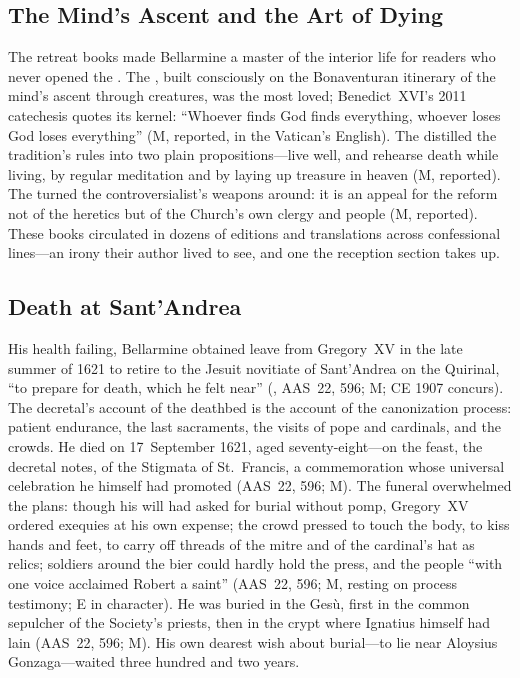\subsection{The Mind's Ascent and the Art of Dying}

The retreat books made Bellarmine a master of the interior life
for readers who never opened the . The
, built consciously on the
Bonaventuran itinerary of the mind's ascent through creatures,
was the most loved; Benedict~XVI's 2011 catechesis quotes its
kernel: ``Whoever finds God finds everything, whoever loses God
loses everything'' (M, reported, in the Vatican's English). The
 distilled the tradition's rules into
two plain propositions---live well, and rehearse death while
living, by regular meditation and by laying up treasure in heaven
(M, reported). The  turned the
controversialist's weapons around: it is an appeal for the reform
not of the heretics but of the Church's own clergy and people
(M, reported). These books circulated in dozens of editions and
translations across confessional lines---an irony their author
lived to see, and one the reception section takes up.

\subsection{Death at Sant'Andrea}

His health failing, Bellarmine obtained leave from Gregory~XV in
the late summer of 1621 to retire to the Jesuit novitiate of
Sant'Andrea on the Quirinal, ``to prepare for death, which he felt
near'' (, AAS~22, 596; M; CE 1907 concurs). The
decretal's account of the deathbed is the account of the
canonization process: patient endurance, the last sacraments, the
visits of pope and cardinals, and the crowds. He died on
17~September 1621, aged seventy-eight---on the feast, the decretal
notes, of the Stigmata of St.~Francis, a commemoration whose
universal celebration he himself had promoted (AAS~22, 596; M).
The funeral overwhelmed the plans: though his will had asked for
burial without pomp, Gregory~XV ordered exequies at his own
expense; the crowd pressed to touch the body, to kiss hands and
feet, to carry off threads of the mitre and of the cardinal's hat
as relics; soldiers around the bier could hardly hold the press,
and the people ``with one voice acclaimed Robert a saint''
(AAS~22, 596; M, resting on process testimony; E in character).
He was buried in the Ges\`u, first in the common sepulcher of the
Society's priests, then in the crypt where Ignatius himself had
lain (AAS~22, 596; M). His own dearest wish about burial---to lie
near Aloysius Gonzaga---waited three hundred and two years.
